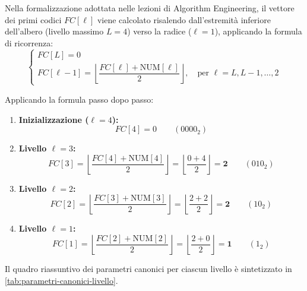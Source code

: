 Nella formalizzazione adottata nelle lezioni di Algorithm Engineering, il vettore dei primi codici $FC[\ell]$ viene calcolato risalendo dall'estremit\`a inferiore dell'albero (livello massimo $L = 4$) verso la radice ($\ell = 1$), applicando la formula di ricorrenza:
\begin{equation}
  \begin{cases}
    FC[L] = 0 \\
    FC[\ell - 1] = \left\lfloor \dfrac{FC[\ell] + \text{NUM}[\ell]}{2} \right\rfloor, \quad \text{per } \ell = L, L-1, \dots, 2
  \end{cases}
\end{equation}

Applicando la formula passo dopo passo:
\begin{enumerate}
  \item \textbf{Inizializzazione ($\ell = 4$):}
  \begin{equation}
    FC[4] = 0 \qquad (0000_2)
  \end{equation}
  \item \textbf{Livello $\ell = 3$:}
  \begin{equation}
    FC[3] = \left\lfloor \frac{FC[4] + \text{NUM}[4]}{2} \right\rfloor = \left\lfloor \frac{0 + 4}{2} \right\rfloor = \mathbf{2} \qquad (010_2)
  \end{equation}
  \item \textbf{Livello $\ell = 2$:}
  \begin{equation}
    FC[2] = \left\lfloor \frac{FC[3] + \text{NUM}[3]}{2} \right\rfloor = \left\lfloor \frac{2 + 2}{2} \right\rfloor = \mathbf{2} \qquad (10_2)
  \end{equation}
  \item \textbf{Livello $\ell = 1$:}
  \begin{equation}
    FC[1] = \left\lfloor \frac{FC[2] + \text{NUM}[2]}{2} \right\rfloor = \left\lfloor \frac{2 + 0}{2} \right\rfloor = \mathbf{1} \qquad (1_2)
  \end{equation}
\end{enumerate}

Il quadro riassuntivo dei parametri canonici per ciascun livello \`e sintetizzato in \autoref{tab:parametri-canonici-livello}.

